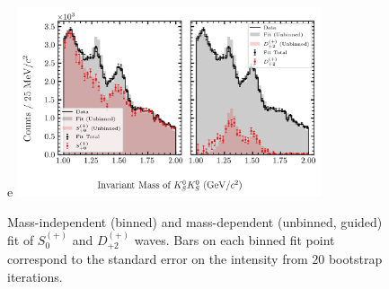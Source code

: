 \begin{figure}
  \begin{center}                                                                                                                                                                                                                                                                                                                                                                                                                                                                                                                                                                                                                                                                                                                                                                                                                                                                                     e
    \includegraphics[width=0.8\textwidth]{figures/binned_and_unbinned_fit_chisqdof_3.4_splot_D_1s_2b_guided_phase_factor_waves491_uncertainty_bootstrap-SE.png}
  \end{center}
  \caption{Mass-independent (binned) and mass-dependent (unbinned, guided) fit of $S_{0}^{(+)}$ and $D_{+2}^{(+)}$ waves. Bars on each binned fit point correspond to the standard error on the intensity from $20$ bootstrap iterations.}\label{fig:unbinned-guided-fit-chisqdof-3.4-Sp-D2p}
\end{figure}

